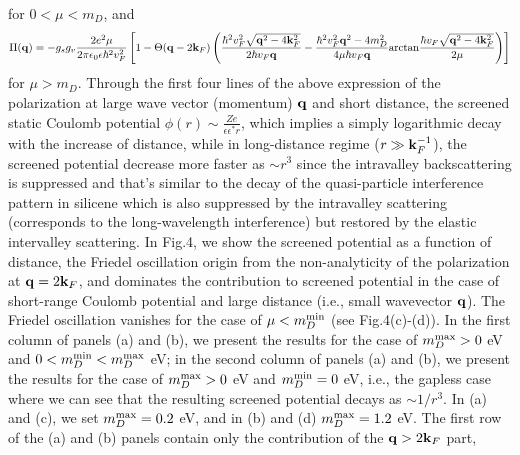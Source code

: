 \documentclass[UTF8,a4paper]{article}
\begin{document}
\begin{large}
\begin{equation}
\end{equation}
for $0<\mu< m_{D}$, and
\begin{equation} 
\begin{aligned}
\Pi({\bf q})=-g_{s}g_{v}\frac{2e^{2}\mu}{2\pi\epsilon_{0}\epsilon \hbar^{2} v_{F}^{2}}
\left[1-\Theta({\bf q}-2{\bf k}_{F})\left(\frac{\hbar^{2} v_{F}^{2}\sqrt{{\bf q}^{2}-4{\bf k}_{F}^{2}}}{2\hbar v_{F}{\bf q}}-\frac{\hbar^{2}v_{F}^{2}{\bf q}^{2}-4 m_{D}^{2}}{4\mu \hbar v_{F}{\bf q}}{\rm arctan}\frac{\hbar v_{F}\sqrt{{\bf q}^{2}-4{\bf k}^{2}_{F}}}{2\mu}\right)\right]
\end{aligned}
\end{equation}
for $\mu> m_{D}$.
Through the first four lines of the above expression of the polarization 
at large wave vector (momentum) ${\bf q}$ and short distance, the screened static Coulomb potential
$\phi(r)\sim \frac{Ze}{\epsilon\epsilon^{*}r}$,
which implies a simply logarithmic decay with the increase of distance,
while in long-distance regime ($r\gg {\bf k}_{F}^{-1}$), the screened potential decrease more faster as $\sim r^{3}$\cite{Pyatkovskiy P K}
since the intravalley backscattering is suppressed and that's similar to the
decay of the quasi-particle interference pattern in silicene which is also suppressed by the intravalley scattering 
(corresponds to the long-wavelength interference)
but restored by the elastic intervalley scattering\cite{XX}.
In Fig.4, we show the 
screened potential as a function of distance,
the Friedel oscillation origin from the non-analyticity of the polarization at ${\bf q}=2{\bf k}_{F}$,
and dominates the contribution to screened potential in the case of short-range Coulomb potential and large distance (i.e., small wavevector ${\bf q}$).
The Friedel oscillation
vanishes for the case of $\mu<m_{D}^{{\rm min}}$ (see Fig.4(c)-(d)).
In the first column of panels (a) and (b), we present the results for the case of $m_{D}^{{\rm max}}>0$ eV
and $0<m_{D}^{{\rm min}}<m_{D}^{{\rm max}}$ eV;
in the second column of panels (a) and (b), we present the results for the case of $m_{D}^{{\rm max}}>0$ eV
and $m_{D}^{{\rm min}}=0$ eV,
i.e., the gapless case where we can see that the resulting screened potential decays as $\sim 1/r^{3}$.
In (a) and (c), we set $m_{D}^{{\rm max}}=0.2$ eV, and in (b) and (d) $m_{D}^{{\rm max}}=1.2$ eV.
The first row of the (a) and (b) panels contain only the contribution of the ${\bf q}>2{\bf k}_{F}$ part,

\end{large}
\end{document}
